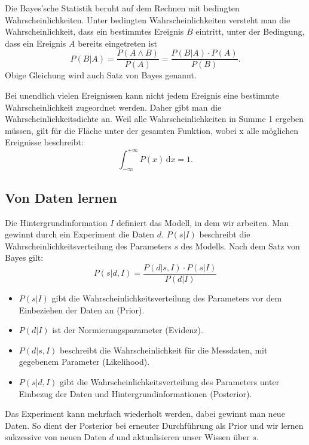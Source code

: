 \documentclass[]{dsadokumentation}
\begin{document}
Die Bayes'sche Statistik beruht auf dem Rechnen mit bedingten Wahrscheinlichkeiten. Unter bedingten Wahrscheinlichkeiten versteht man die Wahrscheinlichkeit, dass ein bestimmtes Ereignis $B$ eintritt, unter der Bedingung, dass ein Ereignis $A$ bereits eingetreten ist
\begin{displaymath}
P(B|A) = \frac{P(A \wedge B)}{P(A)} = \frac{P(B|A)\cdot P(A)}{P(B)}.
\end{displaymath}
Obige Gleichung wird auch Satz von Bayes genannt.

Bei unendlich vielen Ereignissen kann nicht jedem Ereignis eine bestimmte Wahrscheinlichkeit zugeordnet werden. Daher gibt man die Wahrscheinlichkeitsdichte an. Weil alle Wahrscheinlichkeiten in Summe 1 ergeben müssen, gilt für die Fläche unter der gesamten Funktion, wobei x alle möglichen Ereignisse beschreibt:
\begin{displaymath}
\int_{- \infty }^ {+ \infty} P(x) \,\mbox{d}x = 1.
\end{displaymath}


\subsection{Von Daten lernen}
 Die Hintergrundinformation $I$ definiert das Modell, in dem wir arbeiten. Man gewinnt durch ein Experiment die Daten $d$. $P(s|I)$ beschreibt die Wahrscheinlichkeitsverteilung des Parameters $s$ des Modells. Nach dem Satz von Bayes gilt:
\begin{displaymath}
P(s|d,I) = \frac{P(d|s,I)\cdot P(s|I)}{P(d|I)}
\end{displaymath}

\begin{itemize}
 \item $P(s|I)$ gibt die Wahrscheinlichkeitsverteilung des Parameters vor dem Einbeziehen der Daten an (Prior).
 \item $P(d|I)$ ist der Normierungsparameter (Evidenz).
 \item $P(d|s,I)$ beschreibt die Wahrscheinlichkeit für die Messdaten, mit gegebenem Parameter (Likelihood).
 \item $P(s|d,I)$ gibt die Wahrscheinlichkeitsverteilung des Parameters unter Einbezug der Daten und Hintergrundinformationen (Posterior).
\end{itemize}

Das Experiment kann mehrfach wiederholt werden, dabei gewinnt man neue Daten. So dient der Posterior bei erneuter Durchführung als Prior und wir lernen sukzessive von neuen Daten $d$ und aktualisieren unser Wissen über $s$.
\end{document}
